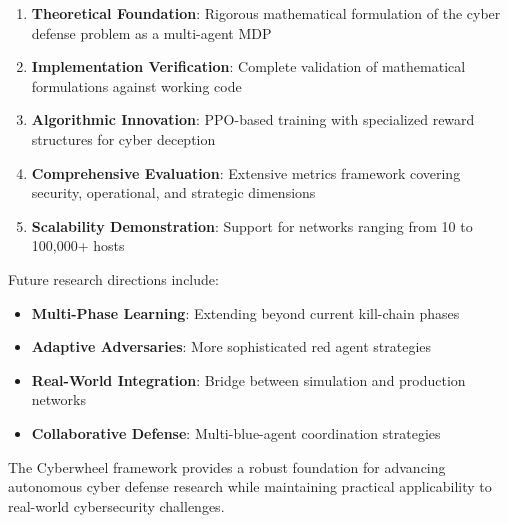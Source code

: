 \documentclass[11pt]{article}
\newcounter{phase}[algorithm]
\theoremstyle{definition}
\theoremstyle{plain}
\begin{document}
\begin{enumerate}
    \item \textbf{Theoretical Foundation}: Rigorous mathematical formulation of the cyber defense problem as a multi-agent MDP
    \item \textbf{Implementation Verification}: Complete validation of mathematical formulations against working code
    \item \textbf{Algorithmic Innovation}: PPO-based training with specialized reward structures for cyber deception
    \item \textbf{Comprehensive Evaluation}: Extensive metrics framework covering security, operational, and strategic dimensions
    \item \textbf{Scalability Demonstration}: Support for networks ranging from 10 to 100,000+ hosts
\end{enumerate}

Future research directions include:
\begin{itemize}
    \item \textbf{Multi-Phase Learning}: Extending beyond current kill-chain phases
    \item \textbf{Adaptive Adversaries}: More sophisticated red agent strategies
    \item \textbf{Real-World Integration}: Bridge between simulation and production networks
    \item \textbf{Collaborative Defense}: Multi-blue-agent coordination strategies
\end{itemize}

The Cyberwheel framework provides a robust foundation for advancing autonomous cyber defense research while maintaining practical applicability to real-world cybersecurity challenges.



\end{document}

